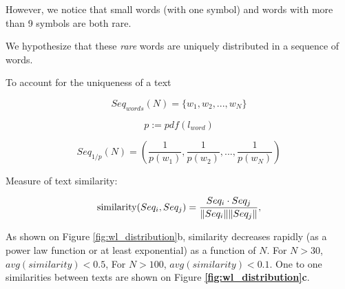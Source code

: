 However, we notice that small words (with one symbol) and words with more than 9 symbols are both rare.

We hypothesize that these {\it rare} words are uniquely distributed in a sequence of words.


To account for the uniqueness of a text

\begin{equation}
Seq_{words}(N) = \{w_{1},w_{2},...,w_{N}\}
\end{equation}


\begin{equation}
p := pdf(l_{word})
\end{equation}

\begin{equation}
Seq_{1/p}(N) = \left( \frac{1}{p(w_{1})},\frac{1}{p(w_{2})},...,\frac{1}{p(w_{N})} \right)
\end{equation}

Measure of text similarity:

\begin{equation*}
\text{similarity}(Seq_{i}, Seq_{j}) = {Seq_{i} \cdot Seq_{j} \over \|Seq_{i}\|\|Seq_{j}\|}, 
\end{equation*}

As shown on Figure \ref{fig:wl_distribution}b, similarity decreases rapidly (as a power law function or at least exponential) as a function of $N$. For $N > 30$, $avg(similarity) < 0.5$, For $N > 100$, $avg(similarity) < 0.1$. One to one similarities between texts are shown on Figure {\bf \ref{fig:wl_distribution}c}.



